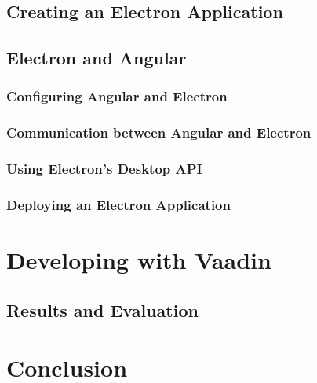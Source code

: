 \documentclass[11pt]{article}
\begin{document}
    \subsection{Creating an Electron Application}\label{subsec:developing-with-electron-creation}
    
    \clearpage

    \subsection{Electron and Angular}\label{subsec:developing-with-electron-angular}
    
    \clearpage

    \subsubsection{Configuring Angular and Electron}\label{subsubsec:developing-with-electron-angular-config}
    
    \clearpage

    \subsubsection{Communication between Angular and Electron}\label{subsubsec:developing-with-electron-angular-communication}
    
    \clearpage

    \subsubsection{Using Electron's Desktop API}\label{subsubsec:developing-with-electron-angular-api}
    
    \clearpage

    \subsubsection{Deploying an Electron Application}\label{subsubsec:developing-with-electron-angular-deployment}
    
    \clearpage

    \section{Developing with Vaadin}\label{sec:developing-vaadin}
    
    \clearpage

    \subsection{Results and Evaluation}\label{subsec:developing-with-electron-angular}
    
    \clearpage

    \section{Conclusion}\label{sec:analysis}
    
    \clearpage

    \printnoidxglossary[type=\acronymtype]
    \clearpage
    \listoffigures
    \clearpage
    \lstlistoflistings
    \clearpage
    \printbibliography
    
    
\end{document}
